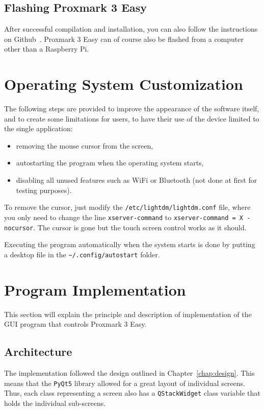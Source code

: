 \subsection{Flashing Proxmark 3 Easy}

After successful compilation and installation, you can also follow the instructions on Github~\cite{githubproxmarkdoc}. Proxmark 3 Easy can of course also be flashed from a computer other than a Raspberry Pi. 

\section{Operating System Customization}

The following steps are provided to improve the appearance of the software itself, and to create some limitations for users, to have their use of the device limited to the single application:

\begin{itemize}
    \item removing the mouse cursor from the screen,
    \item autostarting the program when the operating system starts,
    \item disabling all unused features such as WiFi or Bluetooth (not done at first for testing purposes).
\end{itemize}

To remove the cursor, just modify the \texttt{/etc/lightdm/lightdm.conf} file, where you only need to change the line \texttt{xserver-command} to \texttt{xserver-command = X -nocursor}. The cursor is gone but the touch screen control works as it should.

Executing the program automatically when the system starts is done by putting a desktop file in the \texttt{\textasciitilde{}/.config/autostart} folder.


\section{Program Implementation}

This section will explain the principle and description of implementation of the GUI program that controls Proxmark 3 Easy.

\subsection{Architecture}

The implementation followed the design outlined in Chapter~\ref{chap:design}. This means that the \texttt{PyQt5} library allowed for a great layout of individual screens. Thus, each class representing a screen also has a \texttt{QStackWidget} class variable that holds the individual sub-screens.

